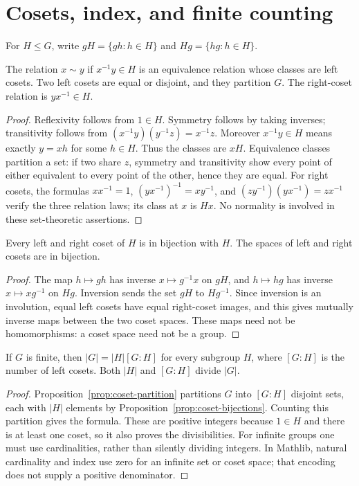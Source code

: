 \chapter{Cosets, index, and finite counting}\label{chap:M07.03}

For $H\leq G$, write $gH=\{gh:h\in H\}$ and $Hg=\{hg:h\in H\}$.
\begin{proposition}\label{prop:coset-partition}
The relation $x\sim y$ if $x^{-1}y\in H$ is an equivalence relation whose classes are left cosets. Two left cosets are equal or disjoint, and they partition $G$. The right-coset relation is $yx^{-1}\in H$.
\end{proposition}
\begin{proof}
Reflexivity follows from $1\in H$. Symmetry follows by taking inverses; transitivity follows from $(x^{-1}y)(y^{-1}z)=x^{-1}z$. Moreover $x^{-1}y\in H$ means exactly $y=xh$ for some $h\in H$. Thus the classes are $xH$. Equivalence classes partition a set: if two share $z$, symmetry and transitivity show every point of either equivalent to every point of the other, hence they are equal. For right cosets, the formulas $xx^{-1}=1$, $(yx^{-1})^{-1}=xy^{-1}$, and $(zy^{-1})(yx^{-1})=zx^{-1}$ verify the three relation laws; its class at $x$ is $Hx$. No normality is involved in these set-theoretic assertions.
\end{proof}

\begin{proposition}\label{prop:coset-bijections}
Every left and right coset of $H$ is in bijection with $H$. The spaces of left and right cosets are in bijection.
\end{proposition}
\begin{proof}
The map $h\mapsto gh$ has inverse $x\mapsto g^{-1}x$ on $gH$, and $h\mapsto hg$ has inverse $x\mapsto xg^{-1}$ on $Hg$. Inversion sends the set $gH$ to $Hg^{-1}$. Since inversion is an involution, equal left cosets have equal right-coset images, and this gives mutually inverse maps between the two coset spaces. These maps need not be homomorphisms: a coset space need not be a group.
\end{proof}

\begin{theorem}\label{thm:lagrange}
If $G$ is finite, then $|G|=|H|[G:H]$ for every subgroup $H$, where $[G:H]$ is the number of left cosets. Both $|H|$ and $[G:H]$ divide $|G|$.
\end{theorem}
\begin{proof}
Proposition~\ref{prop:coset-partition} partitions $G$ into $[G:H]$ disjoint sets, each with $|H|$ elements by Proposition~\ref{prop:coset-bijections}. Counting this partition gives the formula. These are positive integers because $1\in H$ and there is at least one coset, so it also proves the divisibilities. For infinite groups one must use cardinalities, rather than silently dividing integers. In Mathlib, natural cardinality and index use zero for an infinite set or coset space; that encoding does not supply a positive denominator.
\end{proof}

